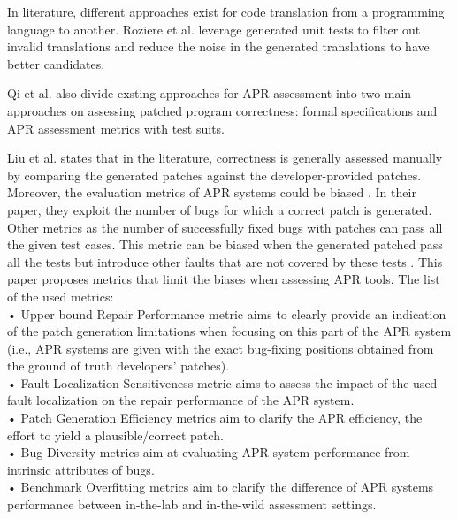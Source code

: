 In literature, different approaches exist for code translation from a programming language to another. Roziere et al. \cite{roziere2021leveraging} leverage generated unit tests to filter out invalid translations and reduce the noise in the generated translations to have better candidates.


Qi et al. \cite{8612557} also divide exsting approaches for APR assessment into two main approaches on assessing patched program correctness: formal specifications and APR assessment metrics with test suits.

Liu et al. \cite{LIU2021110817} states that in the literature, correctness is generally assessed manually by comparing the generated patches against the developer-provided patches. Moreover, the evaluation metrics of APR systems could be biased \cite{LIU2021110817}. In their paper, they exploit the number of bugs for which a correct patch is generated. Other metrics as the number of successfully fixed bugs with patches can pass all the given test cases. This metric can be biased when the generated patched pass all the tests but introduce other faults that are not covered by these tests \cite{LIU2021110817}.
 This paper proposes metrics that limit the biases when assessing APR tools. The list of the used metrics:\\
•  Upper bound Repair Performance metric aims to clearly provide an indication of the patch generation limitations when focusing on this part of the APR system (i.e., APR systems are given with the exact bug-fixing positions obtained from the ground of truth developers’ patches). 
\\
• Fault Localization Sensitiveness metric aims to assess the impact of the used fault localization on the repair performance of the APR system.\\
• Patch Generation Efficiency metrics aim to clarify the APR efficiency, the effort to yield a plausible/correct patch.\\
• Bug Diversity metrics aim at evaluating APR system performance from intrinsic attributes of bugs.\\
• Benchmark Overfitting metrics aim to clarify the difference of APR systems performance between in-the-lab and in-the-wild assessment settings.\\

